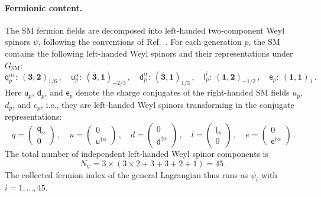 \paragraph{Fermionic content.}
The SM fermion fields are decomposed into left-handed two-component Weyl spinors $\psi$, following the conventions of Ref.~\cite{Dreiner:2008tw}. For each generation $p$, the SM contains the following left-handed Weyl spinors and their representations under $G_{\text{SM}}$:
%
\begin{equation}\label{eq:SM_fermions}
        \mathsf{q}_{p}^{\alpha i}: \ (\mathbf{3},\mathbf{2})_{1/6}\,,\quad
        \mathsf{u}_{p}^{\alpha}: \ (\overline{\mathbf{3}},\mathbf{1})_{-2/3}\,,\quad
        \mathsf{d}_{p}^{\alpha}: \ (\overline{\mathbf{3}},\mathbf{1})_{1/3}\,,\quad
        \mathsf{l}_{p}^{i}: \ (\mathbf{1},\mathbf{2})_{-1/2}\,,\quad
        \mathsf{e}_{p}: \ (\mathbf{1},\mathbf{1})_{1}\,.
\end{equation}
%
Here $\mathsf{u}_p$, $\mathsf{d}_p$, and $\mathsf{e}_p$ denote the charge conjugates of the right-handed SM fields $u_{p}$, $d_{p}$, and $e_{p}$, i.e., they are left-handed Weyl spinors transforming in the conjugate representations:
\begin{equation}
q = \begin{pmatrix}
        \mathsf{q}_\alpha \\
        0 
    \end{pmatrix}\,,
    \quad
    u = \begin{pmatrix}
        0 \\
        \mathsf{u}^{\dagger\dot\alpha} 
    \end{pmatrix}\,,
    \quad
    d = \begin{pmatrix}
        0 \\
        \mathsf{d}^{\dagger\dot\alpha} 
    \end{pmatrix}\,,
    \quad
    l = \begin{pmatrix}
        \mathsf{l}_\alpha \\
        0 
    \end{pmatrix}\,,
    \quad
    e = \begin{pmatrix}
        0 \\
        \mathsf{e}^{\dagger\dot\alpha} 
    \end{pmatrix}\,.
\end{equation}
The total number of independent left-handed Weyl spinor components is
\begin{equation}
    N_\psi = 3\times\left(3\times2 + 3 + 3 + 2 + 1\right) = 45\,.
\end{equation}
The collected fermion index of the general Lagrangian thus runs as $\psi_i$ with $i=1,\dotsc,45$.

